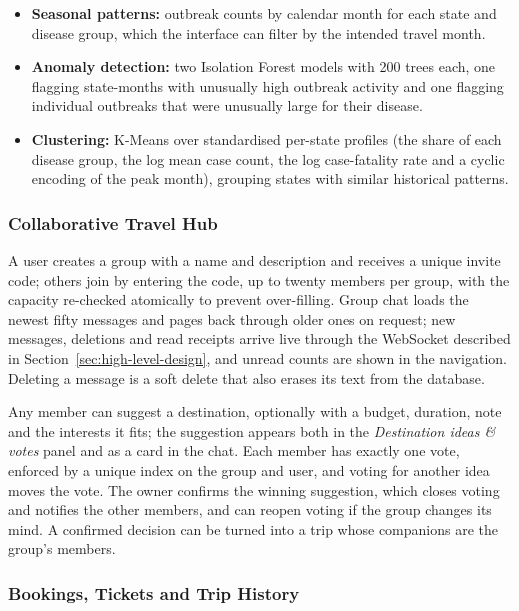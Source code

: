 \begin{itemize}
  \item \textbf{Seasonal patterns:} outbreak counts by calendar month for
    each state and disease group, which the interface can filter by the
    intended travel month.
  \item \textbf{Anomaly detection:} two Isolation Forest models
    \cite{liu2008iforest} with 200 trees each, one flagging state-months
    with unusually high outbreak activity and one flagging individual
    outbreaks that were unusually large for their disease.
  \item \textbf{Clustering:} K-Means \cite{lloyd1982kmeans} over
    standardised per-state profiles (the share of each disease group, the
    log mean case count, the log case-fatality rate and a cyclic encoding of
    the peak month), grouping states with similar historical patterns.
\end{itemize}



\subsubsection{Collaborative Travel Hub}

A user creates a group with a name and description and receives a unique
invite code; others join by entering the code, up to twenty members per
group, with the capacity re-checked atomically to prevent over-filling. Group
chat loads the newest fifty messages and pages back through older ones on
request; new messages, deletions and read receipts arrive live through the
WebSocket described in Section~\ref{sec:high-level-design}, and unread counts
are shown in the navigation. Deleting a message is a soft delete that also
erases its text from the database.

Any member can suggest a destination, optionally with a budget, duration,
note and the interests it fits; the suggestion appears both in the
\emph{Destination ideas \& votes} panel and as a card in the chat. Each
member has exactly one vote, enforced by a unique index on the group and
user, and voting for another idea moves the vote. The owner confirms the
winning suggestion, which closes voting and notifies the other members, and
can reopen voting if the group changes its mind. A confirmed decision can be
turned into a trip whose companions are the group's members.

\subsubsection{Bookings, Tickets and Trip History}

